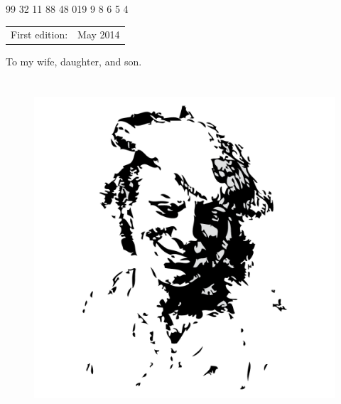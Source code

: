 \documentclass[12pt]{extbook}
\newcommand\blankpage{%
    \null
    \thispagestyle{empty}%
    \addtocounter{page}{-1}%
    \newpage}
\begin{document}
  \begin{center}
    99 32 11 88 48 01\hspace{2em}9 9 8 6 5 4 %
  \end{center}

  \begin{center}
  \begin{tabular}{ll}
    First edition:  & May 2014
  \end{tabular}
  \end{center}

  \vfill
  \vspace*{2\baselineskip}
  \clearpage
  \endgroup

  \begingroup
  \vspace*{\fill}
  \begin{center}
  To my wife, daughter, and son.
  \end{center}
  \vspace*{\fill}
  \afterpage{\blankpage}
  \endgroup
  \setcounter{page}{0}
  \clearpage
  

  
  \pagestyle{fancy}

  \section{}\label{section}
  
  \begin{figure}[htbp]
  \centering
  \includegraphics{img/head.png}
  \end{figure}
  
\end{document}

